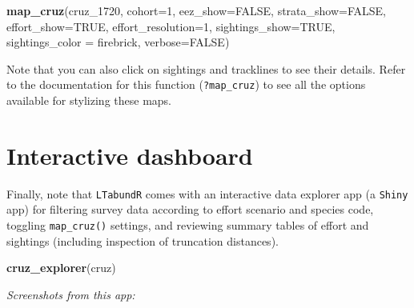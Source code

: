 \documentclass[
]{book}
\newenvironment{Shaded}{\begin{snugshade}}{\end{snugshade}}
\newcommand{\AttributeTok}[1]{\textcolor[rgb]{0.13,0.29,0.53}{#1}}
\newcommand{\ConstantTok}[1]{\textcolor[rgb]{0.56,0.35,0.01}{#1}}
\newcommand{\DecValTok}[1]{\textcolor[rgb]{0.00,0.00,0.81}{#1}}
\newcommand{\FunctionTok}[1]{\textcolor[rgb]{0.13,0.29,0.53}{\textbf{#1}}}
\newcommand{\NormalTok}[1]{#1}
\newcommand{\StringTok}[1]{\textcolor[rgb]{0.31,0.60,0.02}{#1}}
\begin{document}
\begin{Shaded}
\begin{Highlighting}[]
 \FunctionTok{map\_cruz}\NormalTok{(cruz\_1720,}
          \AttributeTok{cohort=}\DecValTok{1}\NormalTok{,}
          \AttributeTok{eez\_show=}\ConstantTok{FALSE}\NormalTok{,}
          \AttributeTok{strata\_show=}\ConstantTok{FALSE}\NormalTok{,}
          \AttributeTok{effort\_show=}\ConstantTok{TRUE}\NormalTok{,}
          \AttributeTok{effort\_resolution=}\DecValTok{1}\NormalTok{,}
          \AttributeTok{sightings\_show=}\ConstantTok{TRUE}\NormalTok{,}
          \AttributeTok{sightings\_color =} \StringTok{\textquotesingle{}firebrick\textquotesingle{}}\NormalTok{,}
          \AttributeTok{verbose=}\ConstantTok{FALSE}\NormalTok{)}
\end{Highlighting}
\end{Shaded}

Note that you can also click on sightings and tracklines to see their details. Refer to the documentation for this function (\texttt{?map\_cruz}) to see all the options available for stylizing these maps.

\hypertarget{interactive-dashboard}{%
\section*{Interactive dashboard}\label{interactive-dashboard}}

Finally, note that \texttt{LTabundR} comes with an interactive data explorer app (a \texttt{Shiny} app) for filtering survey data according to effort scenario and species code, toggling \texttt{map\_cruz()} settings, and reviewing summary tables of effort and sightings (including inspection of truncation distances).

\begin{Shaded}
\begin{Highlighting}[]
\FunctionTok{cruz\_explorer}\NormalTok{(cruz)}
\end{Highlighting}
\end{Shaded}

\emph{Screenshots from this app:}

~\\
\end{document}
